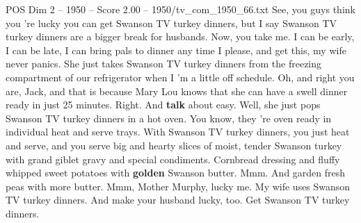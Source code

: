 \begin{textsample}{POS Dim 2 – 1950 – Score 2.00 – 1950/tv\_com\_1950\_66.txt}  \label{ex:f2_pos_016}
See, you guys think you 're lucky you can get Swanson TV turkey dinners, but I say Swanson TV turkey dinners are a bigger break for husbands.
Now, you take me.
I can be early, I can be late, I can bring pals to dinner any time I please, and get this, my wife never panics.
She just takes Swanson TV turkey dinners from the freezing compartment of our refrigerator when I 'm a little off schedule.
Oh, and right you are, Jack, and that is because Mary Lou knows that she can have a swell dinner ready in just 25 minutes.
Right.
And \textbf{talk} about easy.
Well, she just pops Swanson TV turkey dinners in a hot oven.
You know, they 're oven ready in individual heat and serve trays.
With Swanson TV turkey dinners, you just heat and serve, and you serve big and hearty slices of moist, tender Swanson turkey with grand giblet gravy and special condiments.
Cornbread dressing and fluffy whipped sweet potatoes with \textbf{golden} Swanson butter.
Mmm.
And garden fresh peas with more butter.
Mmm, Mother Murphy, lucky me.
My wife uses Swanson TV turkey dinners.
And make your husband lucky, too.
Get Swanson TV turkey dinners.

\end{textsample}
